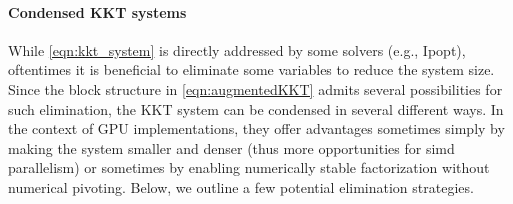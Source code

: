 \documentclass{article}
\begin{document}
\paragraph{Condensed KKT systems}
While \cref{eqn:kkt_system} is directly addressed by some solvers (e.g., Ipopt), oftentimes it is beneficial to eliminate some variables to reduce the system size. Since the block structure in \cref{eqn:augmentedKKT} admits several possibilities for such elimination, the KKT system can be condensed in several different ways. In the context of GPU implementations, they offer advantages sometimes simply by making the system smaller and denser (thus more opportunities for \gls*{simd} parallelism) or sometimes by enabling numerically stable factorization without numerical pivoting. Below, we outline a few potential elimination strategies.
\end{document}
